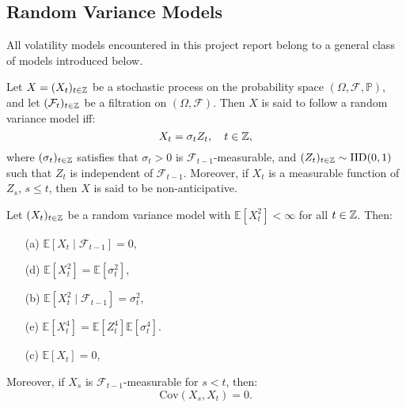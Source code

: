\subsection{Random Variance Models}
All volatility models encountered in this project report belong to a general class of models introduced below.
\begin{defn}\label{defn:rvm}
Let $X=(X_{t})_{t\in\mathbb{Z}}$ be a stochastic process on the probability space $(\Omega,\mathcal{F},\mathbb{P})$, and let $(\mathcal{F}_{t})_{t\in\mathbb{Z}}$ be a filtration on $(\Omega,\mathcal{F})$. Then $X$ is said to follow a random variance model iff:
\begin{equation}
    X_{t}=\sigma_{t}Z_{t},\quad t\in\mathbb{Z},
\end{equation}
where $(\sigma_{t})_{t\in\mathbb{Z}}$ satisfies that $\sigma_{t}>0$ is $\mathcal{F}_{t-1}$-measurable, and $(Z_{t})_{t\in\mathbb{Z}}\sim\mathrm{IID}(0,1)$ such that $Z_{t}$ is independent of $\mathcal{F}_{t-1}$. %
Moreover, if $X_{t}$ is a measurable function of $Z_{s}$, $s\leq t$, then $X$ is said to be non-anticipative.
\end{defn}
\begin{prop}\label{prop:rvmfacts}
Let $(X_{t})_{t\in\mathbb{Z}}$ be a random variance model with $\mathbb{E}[X_{t}^{2}]<\infty$ for all $t\in\mathbb{Z}$. Then:
\begin{multicols}{3}
  \begin{enumerate}
    \item[(a)] $\mathbb{E}[X_{t}\mid\mathcal{F}_{t-1}]=0$,
    \item[(d)] $\mathbb{E}[X_{t}^{2}]=\mathbb{E}[\sigma_{t}^{2}]$,
    \item[(b)] $\mathbb{E}[X_{t}^{2}\mid\mathcal{F}_{t-1}]=\sigma_{t}^{2}$,
    \item[(e)] $\mathbb{E}[X_{t}^{4}]=\mathbb{E}[Z_{t}^{4}]\mathbb{E}[\sigma_{t}^4]$.
    \item[(c)] $\mathbb{E}[X_{t}]=0$,
    \item[\vspace{\fill}]
 \end{enumerate}
\end{multicols}
\noindent Moreover, if $X_{s}$ is $\mathcal{F}_{t-1}$-measurable for $s<t$, then:
\begin{equation}\label{eq:rvmprop1}
    \mathrm{Cov}(X_{s},X_{t})=0.
\end{equation}
\end{prop}
